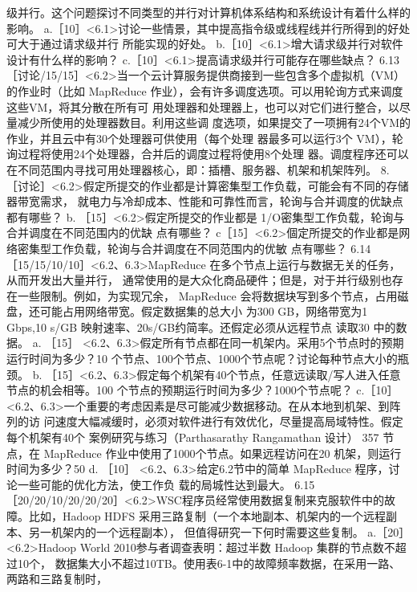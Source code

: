 级并行。这个问题探讨不同类型的并行对计算机体系结构和系统设计有着什么样的影响。
a.［10］<6.1>讨论一些情景，其中提高指令级或线程线并行所得到的好处可大于通过请求级并行
所能实现的好处。
b.［10］<6.1>增大请求级并行对软件设计有什么样的影响？
c.［10］<6.1>提高请求级并行可能存在哪些缺点？
6.13［讨论/15/15］<6.2>当一个云计算服务提供商接到一些包含多个虚拟机（VM）的作业时（比如
MapReduce 作业），会有许多调度选项。可以用轮询方式来调度这些VM，将其分散在所有可
用处理器和处理器上，也可以对它们进行整合，以尽量减少所使用的处理器数目。利用这些调
度选项，如果提交了一项拥有24个VM的作业，并且云中有30个处理器可供使用（每个处理
器最多可以运行3个 VM），轮询过程将使用24个处理器，合并后的调度过程将使用8个处理
器。调度程序还可以在不同范围内寻找可用处理器核心，即：插槽、服务器、机架和机架阵列。
8.［讨论］<6.2>假定所提交的作业都是计算密集型工作负载，可能会有不同的存储器带宽需求，
就电力与冷却成本、性能和可靠性而言，轮询与合并调度的优缺点都有哪些？
b. ［15］<6.2>假定所提交的作业都是 1/O密集型工作负载，轮询与合并调度在不同范围内的优缺
点有哪些？
c［15］<6.2>個定所提交的作业都是网络密集型工作负载，轮询与合并调度在不同范围内的优敏
点有哪些？
6.14 ［15/15/10/10］<6.2、6.3>MapReduce 在多个节点上运行与数据无关的任务，从而开发出大量并行，
通常使用的是大众化商品硬件；但是，对于并行级别也存在一些限制。例如，为实现冗余，
MapReduce 会将数据块写到多个节点，占用磁盘，还可能占用网络带宽。假定数据集的总大小
为300 GB，网络带宽为1 Gbps,10 s/GB 映射速率、20s/GB约简率。还假定必须从远程节点
读取30%
中的数据。
a. ［15］ <6.2、6.3>假定所有节点都在同一机架内。采用5个节点时的预期运行时间为多少？10
个节点、100个节点、1000个节点呢？讨论每种节点大小的瓶颈。
b. ［15］<6.2、6.3>假定每个机架有40个节点，任意远读取/写人进入任意节点的机会相等。100
个节点的预期运行时间为多少？1000个节点呢？
c.［10］<6.2、6.3>一个重要的考虑因素是尽可能减少数据移动。在从本地到机架、到阵列的访
问速度大幅减缓时，必须对软件进行有效优化，尽量提高局域特性。假定每个机架有40个
案例研究与练习（Parthasarathy Rangamathan 设计）
357
节点，在 MapReduce 作业中使用了1000个节点。如果远程访问在20%
机架，则运行时间为多少？50%
d. ［10］ <6.2、6.3>给定6.2节中的简单 MapReduce 程序，讨论一些可能的优化方法，使工作负
载的局城性达到最大。
6.15 ［20/20/10/20/20/20］<6.2>WSC程序员经常使用数据复制来克服软件中的故障。比如，Hadoop
HDFS 采用三路复制（一个本地副本、机架内的一个远程副本、另一机架内的一个远程副本），
但值得研究一下何时需要这些复制。
a.［20］<6.2>Hadoop World 2010参与者调查表明：超过半数 Hadoop 集群的节点数不超过10个，
数据集大小不超过10TB。使用表6-1中的故障频率数据，在采用一路、两路和三路复制时，
